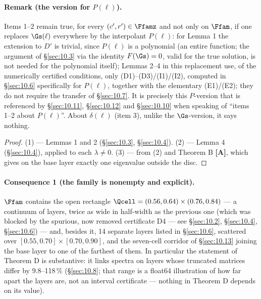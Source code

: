 \paragraph{Remark (the version for $P(\ell)$).} Items 1--2 remain true, for every
$(c',r')\in\Ffamz$ and not only on $\Ffam$, if one replaces
$\Gs(\ell)$ everywhere by the interpolant $P(\ell)$: for Lemma 1 the extension to
$D'$ is trivial, since $P(\ell)$ is a polynomial (an entire function; the
argument of \S\ref{sec:10.3} via the identity $F(\Gs)=0$, valid for the true solution, is
not needed for the polynomial itself); Lemmas 2--4 in this replacement use, of the
numerically certified conditions, only (D1)--(D3)/(I1)/(I2), computed in \S\ref{sec:10.6}
specifically for $P(\ell)$, together with the elementary (E1)/(E2); they do not
require the transfer of \S\ref{sec:10.7}.
It is precisely this $P$-version
that is referenced by \S\ref{sec:10.11}, \S\ref{sec:10.12} and \S\ref{sec:10.10} when speaking
of ``items 1--2 about $P(\ell)$''. About $\delta(\ell)$ (item 3), unlike the $\Gs$-version,
it says nothing.

\begin{proof}
(1) --- Lemmas 1 and 2 (\S\ref{sec:10.3}, \S\ref{sec:10.4}). (2) --- Lemma 4 (\S\ref{sec:10.4}), applied to each $\lambda \ne 0$. (3) ---
from (2) and Theorem B \textbf{[A]}, which gives on the base layer exactly one
eigenvalue outside the disc. \qedhere
\end{proof}

\paragraph{Consequence 1 (the family is nonempty and explicit).} $\Ffam$ contains the
open rectangle $\Qcell = (0.56, 0.64) \times (0.76, 0.84)$ --- a continuum of layers,
twice as wide in half-width as the previous one (which was blocked by the
spurious, now removed certificate D4 --- see \S\ref{sec:10.2}, \S\ref{sec:10.4}, \S\ref{sec:10.6}) --- and, besides it,
14 separate layers listed in \S\ref{sec:10.6}, scattered over $[0.55, 0.70] \times [0.70, 0.90]$,
and the seven-cell corridor of \S\ref{sec:10.13} joining the base layer to one
of the farthest of them.
In particular the statement of Theorem D is substantive: it links spectra on
layers whose truncated matrices differ by 9.8--118\,\% (\S\ref{sec:10.8}; that
range is a float64 illustration of how far apart the layers are, not an
interval certificate --- nothing in Theorem D depends on its value).

